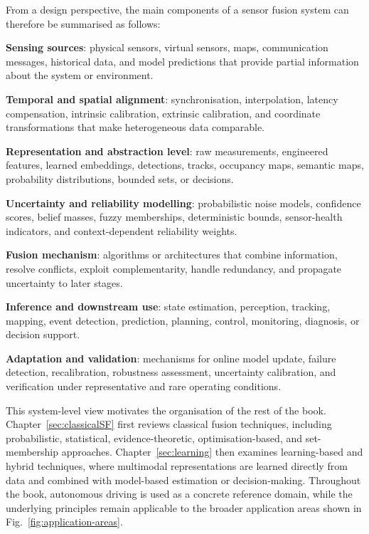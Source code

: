 From a design perspective, the main components of a sensor fusion system can therefore be summarised as follows:
\begin{list4a}
    \item \textbf{Sensing sources}: physical sensors, virtual sensors, maps, communication messages, historical data, and model predictions that provide partial information about the system or environment.
    \item \textbf{Temporal and spatial alignment}: synchronisation, interpolation, latency compensation, intrinsic calibration, extrinsic calibration, and coordinate transformations that make heterogeneous data comparable.
    \item \textbf{Representation and abstraction level}: raw measurements, engineered features, learned embeddings, detections, tracks, occupancy maps, semantic maps, probability distributions, bounded sets, or decisions.
    \item \textbf{Uncertainty and reliability modelling}: probabilistic noise models, confidence scores, belief masses, fuzzy memberships, deterministic bounds, sensor-health indicators, and context-dependent reliability weights.
    \item \textbf{Fusion mechanism}: algorithms or architectures that combine information, resolve conflicts, exploit complementarity, handle redundancy, and propagate uncertainty to later stages.
    \item \textbf{Inference and downstream use}: state estimation, perception, tracking, mapping, event detection, prediction, planning, control, monitoring, diagnosis, or decision support.
    \item \textbf{Adaptation and validation}: mechanisms for online model update, failure detection, recalibration, robustness assessment, uncertainty calibration, and verification under representative and rare operating conditions.
\end{list4a}

This system-level view motivates the organisation of the rest of the book. Chapter~\ref{sec:classicalSF} first reviews classical fusion techniques, including probabilistic, statistical, evidence-theoretic, optimisation-based, and set-membership approaches. Chapter~\ref{sec:learning} then examines learning-based and hybrid techniques, where multimodal representations are learned directly from data and combined with model-based estimation or decision-making. Throughout the book, autonomous driving is used as a concrete reference domain, while the underlying principles remain applicable to the broader application areas shown in Fig.~\ref{fig:application-areas}.

